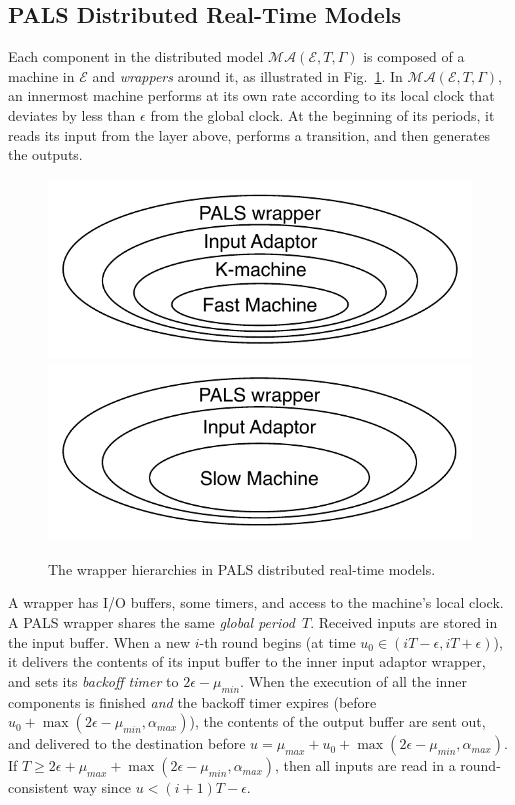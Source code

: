 \subsection{PALS Distributed  Real-Time Models}
\label{pals-dist}

Each component in the  distributed model $\mathcal{MA}(\mathcal{E}, T, \Gamma)$
is composed of a machine in $\mathcal{E}$ and \emph{wrappers} around it, as illustrated in Fig.~\ref{fig:wrappers}.
In $\mathcal{MA}(\mathcal{E}, T, \Gamma)$,
an innermost machine performs at its own rate according to its local clock
that deviates by less than $\epsilon$ from the global  clock.
At the beginning of its periods, it reads its input from the layer above, 
performs a transition, and then generates the outputs.

\begin{figure}
\centering
\includegraphics[width=0.49\columnwidth,clip=true,trim=0.3cm 0.3cm 0.3cm 0.3cm]{Onion-f.pdf}
\hfill
\includegraphics[width=0.49\columnwidth,clip=true,trim=0.3cm 0.3cm 0.3cm 0.3cm]{Onion-s.pdf}
\caption{The wrapper hierarchies %
in PALS distributed real-time  models.}
\label{fig:wrappers}
\end{figure}


%
A wrapper has I/O buffers, some timers, and access to the machine's  local clock.
A PALS wrapper %
shares the same \emph{global period~$T$}.
Received inputs are stored in the input buffer.
When a new $i$-th round begins %
(at time $u_0 \in (iT-\epsilon, iT+\epsilon)$),
it delivers the contents of its input buffer to the inner input adaptor wrapper,
and sets its \emph{backoff timer} to $2\epsilon -\mu_{min}$.
When the execution of all the inner components is finished \emph{and}
the backoff timer expires (before $u_0 + \max(2\epsilon -\mu_{min}, \alpha_{max})$),
the contents of the output buffer are sent out, %
and delivered to the destination before $u = \mu_{max} + u_0 +  \max(2\epsilon -\mu_{min}, \alpha_{max})$.
If $T\geq 2\epsilon + \mu_{max} + \max(2\epsilon -\mu_{min}, \alpha_{max})$,
then all inputs are read in a round-consistent way since $u < (i+1)T - \epsilon$.



